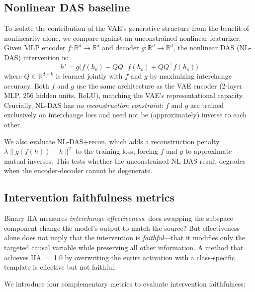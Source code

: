 \documentclass{article}
\newcommand{\R}{\mathbb{R}}
\begin{document}
\subsection{Nonlinear DAS baseline}
\label{sec:nldas}

To isolate the contribution of the VAE's generative structure from the benefit
of nonlinearity alone, we compare against an unconstrained nonlinear featurizer.
Given MLP encoder $f: \R^d \to \R^d$ and decoder $g: \R^d \to \R^d$, the
nonlinear DAS (NL-DAS) intervention is:
\begin{equation}
h' = g\bigl(f(h_b) - QQ^\top f(h_b) + QQ^\top f(h_s)\bigr)
\label{eq:nldas}
\end{equation}
where $Q \in \R^{d \times k}$ is learned jointly with $f$ and $g$ by maximizing
interchange accuracy. Both $f$ and $g$ use the same architecture as the VAE
encoder (2-layer MLP, 256 hidden units, ReLU), matching the VAE's representational
capacity. Crucially, NL-DAS has \emph{no reconstruction constraint}: $f$ and $g$
are trained exclusively on interchange loss and need not be (approximately)
inverse to each other.

We also evaluate NL-DAS+recon, which adds a reconstruction penalty
$\lambda \| g(f(h)) - h \|^2$ to the training loss, forcing $f$ and $g$ to
approximate mutual inverses. This tests whether the unconstrained NL-DAS result
degrades when the encoder-decoder cannot be degenerate.

\subsection{Intervention faithfulness metrics}
\label{sec:faithfulness_metrics}

Binary IIA measures \emph{interchange effectiveness}: does swapping the
subspace component change the model's output to match the source? But
effectiveness alone does not imply that the intervention is \emph{faithful}---that
it modifies only the targeted causal variable while preserving all other
information. A method that achieves IIA~=~1.0 by overwriting the entire
activation with a class-specific template is effective but not faithful.

We introduce four complementary metrics to evaluate intervention faithfulness:
\end{document}

